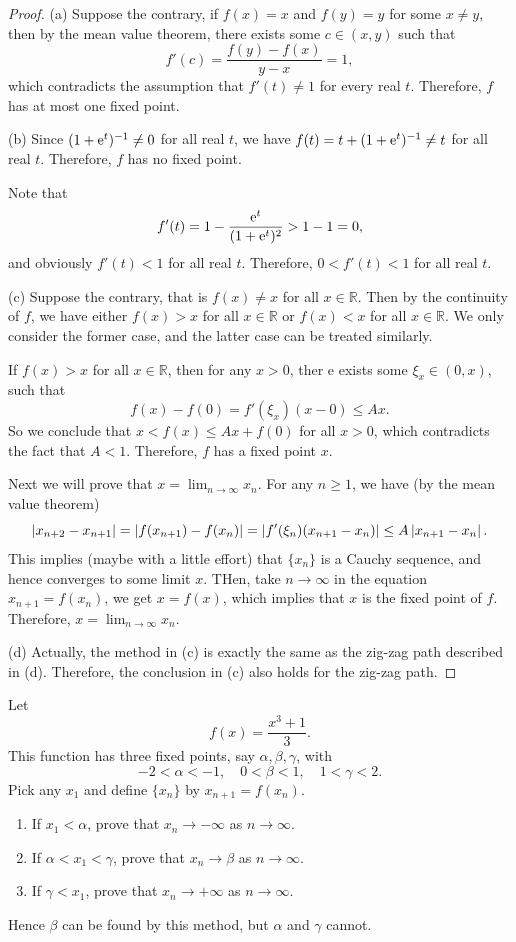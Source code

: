 \documentclass{article}
\begin{document}
\begin{proof}
  (a) Suppose the contrary, if \( f(x)=x \) and \( f(y)=y \) for some \( x\ne y \), then by the mean value theorem, there exists some \( c \in (x,y) \) such that
  \[ f'(c)=\frac{f(y)-f(x)}{y-x}=1, \]
  which contradicts the assumption that \( f'(t)\ne 1 \) for every real \( t \). Therefore, \( f \) has at most one fixed point.\par
  (b) Since \( (1+\mathrm{e}^t)^{-1}\neq 0 \) for all real \( t \), we have \( f(t)=t+(1+\mathrm{e}^t)^{-1}\neq t \) for all real \( t \). Therefore, \( f \) has no fixed point. \par
  Note that
  \[ f'(t)=1-\frac{\mathrm{e}^t}{(1+\mathrm{e}^t)^2}>1-1=0, \]
  and obviously \( f'(t)<1 \) for all real \( t \). Therefore, \( 0<f'(t)<1 \) for all real \( t \).\par
  (c) Suppose the contrary, that is \( f(x) \neq x \) for all \( x \in \mathbb{R} \). Then by the continuity of \( f \), we have either \( f(x)>x \) for all \( x \in \mathbb{R} \) or \( f(x)<x \) for all \( x \in \mathbb{R} \). We only consider the former case, and the latter case can be treated similarly. \par
  If \( f(x)>x \) for all \( x \in \mathbb{R} \), then for any \( x>0 \), ther e exists some \( \xi_x\in(0,x) \), such that
  \[ f(x)-f(0)=f'(\xi_x)(x-0)\le A x. \]
  So we conclude that \( x<f(x)\le Ax+f(0) \) for all \( x>0 \), which contradicts the fact that \( A<1 \). Therefore, \( f \) has a fixed point \( x \).\par
  Next we will prove that \( x=\lim_{n\to\infty}x_n \). For any \( n\ge 1 \), we have (by the mean value theorem)
  \[ \left|x_{n+2}-x_{n+1}\right|=\left|f(x_{n+1})-f(x_n)\right|= \left|f'(\xi_n)(x_{n+1}-x_n)\right|\le A\left|x_{n+1}-x_n\right|. \]
  This implies (maybe with a little effort) that \( \{x_n\} \) is a Cauchy sequence, and hence converges to some limit \( x \). THen, take \( n\to\infty \) in the equation \( x_{n+1}=f(x_n) \), we get \( x=f(x) \), which implies that \( x \) is the fixed point of \( f \). Therefore, \( x=\lim_{n\to\infty}x_n \).\par
  (d) Actually, the method in (c) is exactly the same as the zig-zag path described in (d). Therefore, the conclusion in (c) also holds for the zig-zag path.
\end{proof}



\begin{problem}[5-23]
Let
\[
f(x)=\frac{x^3+1}{3}.
\]
This function has three fixed points, say $\alpha,\beta,\gamma$, with
\[
-2<\alpha<-1,\quad 0<\beta<1,\quad 1<\gamma<2.
\]
Pick any $x_1$ and define $\{x_n\}$ by $x_{n+1}=f(x_n)$.
\begin{enumerate}[label=(\alph*)]
  \item If $x_1<\alpha$, prove that $x_n\to-\infty$ as $n\to\infty$.
  \item If $\alpha<x_1<\gamma$, prove that $x_n\to\beta$ as $n\to\infty$.
  \item If $\gamma<x_1$, prove that $x_n\to+\infty$ as $n\to\infty$.
\end{enumerate}
Hence $\beta$ can be found by this method, but $\alpha$ and $\gamma$ cannot.
\end{problem}
\end{document}
